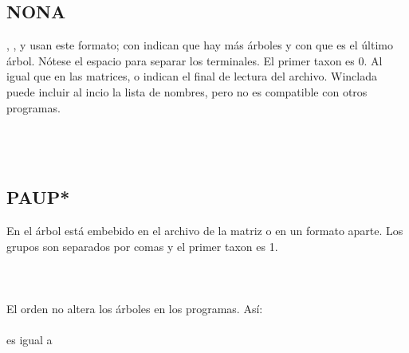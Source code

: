 \subsection{NONA}
\noindent
{}, ,  y  usan este formato; con \cmd{*} indican que hay m\'as \'arboles y con \cmd{;} que es el \'ultimo \'arbol. N\'otese el espacio para separar los terminales. El primer taxon es 0. Al igual que en las matrices,  o  indican el final de lectura del archivo. Winclada puede incluir al incio la lista de nombres, pero no es compatible con otros programas.\\
\\
\noindent
{}\\
\\
\subsection{PAUP*}
En  el \'arbol est\'a embebido en el archivo de la matriz o en un formato aparte. Los grupos son separados por comas y  el primer taxon es 1.\\
\\
\noindent
{}\\
\\
El orden no altera los \'arboles en los programas. As\'i:\\
\\
es igual a\\
